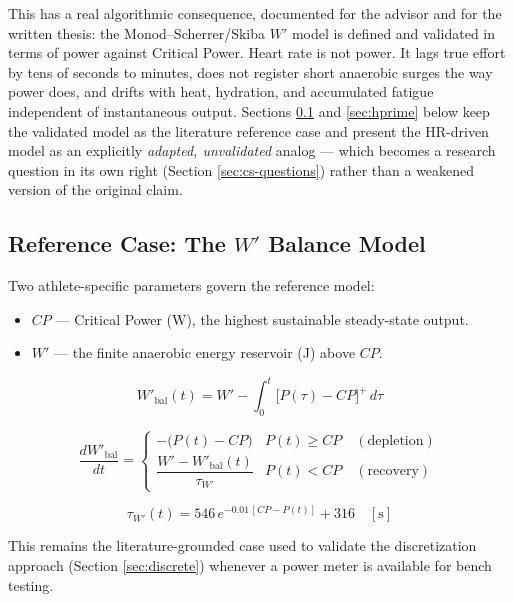 \documentclass[11pt, letterpaper]{article}
\begin{document}
This has a real algorithmic consequence, documented for the advisor and for the written
thesis: the Monod--Scherrer/Skiba $W'$ model is defined and validated in terms of power against
Critical Power. Heart rate is not power. It lags true effort by tens of seconds to minutes, does
not register short anaerobic surges the way power does, and drifts with heat, hydration, and
accumulated fatigue independent of instantaneous output. Sections \ref{sec:wprime} and
\ref{sec:hprime} below keep the validated model as the literature reference case and present the
HR-driven model as an explicitly \textit{adapted, unvalidated} analog --- which becomes a
research question in its own right (Section \ref{sec:cs-questions}) rather than a
weakened version of the original claim.

\subsection{Reference Case: The $W'$ Balance Model}
\label{sec:wprime}

Two athlete-specific parameters govern the reference model:
\begin{itemize}
  \item $CP$ --- Critical Power (W), the highest sustainable steady-state output.
  \item $W'$ --- the finite anaerobic energy reservoir (J) above $CP$.
\end{itemize}

\begin{equation}
  W'_{\mathrm{bal}}(t) = W' - \int_{0}^{t} \bigl[P(\tau) - CP\bigr]^{+} \, d\tau
  \label{eq:depletion}
\end{equation}

\begin{equation}
  \frac{dW'_{\mathrm{bal}}}{dt} =
  \begin{cases}
    -\!\bigl(P(t) - CP\bigr) & P(t) \geq CP \quad (\text{depletion}) \\[6pt]
    \dfrac{W' - W'_{\mathrm{bal}}(t)}{\tau_{W'}} & P(t) < CP \quad (\text{recovery})
  \end{cases}
  \label{eq:skiba}
\end{equation}

\begin{equation}
  \tau_{W'}(t) = 546\,e^{-0.01\,[CP - P(t)]} + 316 \quad [\text{s}]
  \label{eq:tau}
\end{equation}

This remains the literature-grounded case used to validate the discretization approach
(Section \ref{sec:discrete}) whenever a power meter is available for bench testing.
\end{document}
